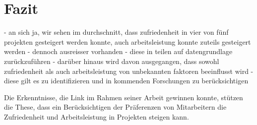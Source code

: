 
\chapter{Fazit}
\label{ch:fazit}
- an sich ja, wir sehen im durchschnitt, dass zufriedenheit in vier von fünf projekten gesteigert werden konnte, auch arbeitsleistung konnte zuteils gesteigert werden
- dennoch ausreisser vorhanden
- diese in teilen auf datengrundlage zurückzuführen
- darüber hinaus wird davon ausgegangen, dass sowohl zufriedenheit als auch arbeitsleistung von unbekannten faktoren beeinflusst wird
- diese gilt es zu identifizieren und in kommenden Forschungen zu berücksichtigen


Die Erkenntnisse, die Link im Rahmen seiner Arbeit gewinnen konnte, stützen die These, dass ein Berücksichtigen der Präferenzen von Mitarbeitern die Zufriedenheit und Arbeitsleistung in Projekten steigen kann.

